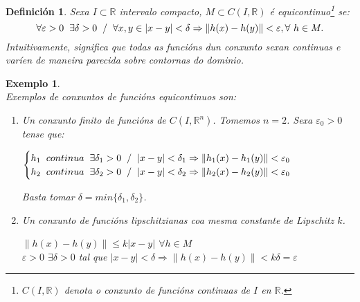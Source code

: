 \documentclass[11pt, a4paper,twoside]{article}
\newcommand{\iindex}[1]{\emph{#1}\index{#1}}
\theoremstyle{theorem-style}  %
\theoremstyle{definition-style}
\newtheorem{definition}{Definición}[section]
\theoremstyle{example-style}
\newtheorem{example}{Exemplo}[section]
\providecommand{\norm}[1]{\left\lVert#1\right\rVert} %
\begin{document}
\begin{definition}
	Sexa $I \subset \mathbb{R}$ intervalo compacto, $M \subset C(I, \mathbb{R})$ é \iindex{equicontinuo}\footnote{ $ C(I, \mathbb{R})$ denota o conxunto de funcións continuas de $ I $ en $ \mathbb{R} $.} se:
	\[\forall \varepsilon > 0 \hspace{0,2cm} \exists \delta > 0 \hspace{0,2cm} / \hspace{0,2cm} \forall x, y\in |x-y| < \delta \Rightarrow \norm{h(x) - h(y)} < \varepsilon, \forall \ h \in M.\]
	Intuitivamente, significa que todas as funcións dun conxunto sexan continuas e varíen de maneira parecida sobre contornas do dominio.
\end{definition}
\begin{example} \ \\
	Exemplos de conxuntos de funcións equicontinuos son:
	\begin{enumerate}
		\item Un conxunto finito de funcións de $C(I, \mathbb{R}^n)$. Tomemos $n = 2$. Sexa $\varepsilon_0 > 0$ tense que:
		\begin{center}
			$\begin{cases}
			h_1 \hspace{0,2cm} continua \hspace{0,2cm} \exists \delta_1 > 0 \hspace{0,2cm} / \hspace{0,2cm} |x-y|<\delta_1 \Rightarrow \norm{h_1(x) - h_1(y)} < \varepsilon_0 \\
			h_2 \hspace{0,2cm} continua \hspace{0,2cm} \exists \delta_2 > 0 \hspace{0,2cm} / \hspace{0,2cm} |x-y|<\delta_2 \Rightarrow \norm{h_2(x) - h_2(y)} < \varepsilon_0
			\end{cases}$
		\end{center}
		Basta tomar $\delta = min\{\delta_1, \delta_2\}$.
		\item Un conxunto de funcións lipschitzianas coa mesma constante de Lipschitz $k$.
		\begin{center}
			$\norm{h(x) - h(y)}\leq k|x-y|$ $\forall h \in M$ \\
			$\varepsilon > 0$ $\exists \delta > 0$ tal que $|x-y|<\delta \Rightarrow \norm{h(x) - h(y)} < k\delta = \varepsilon$
		\end{center}
	\end{enumerate}
\end{example}
\end{document}
